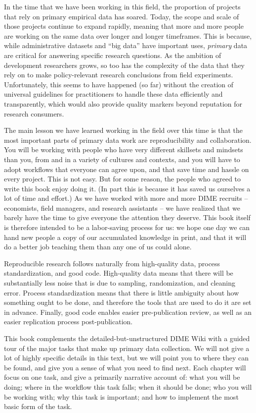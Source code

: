 In the time that we have been working in this field,
the proportion of projects that rely on primary empirical data has soared.\cite{angrist2017economic}
Today, the scope and scale of those projects continue to expand rapidly,
meaning that more and more people are working on the same data over longer and longer timeframes.
This is because, while administrative datasets and ``big data'' have important uses,
\textit{primary} data are critical for answering specific research questions.
As the ambition of development researchers grows, so too has the complexity of the data
that they rely on to make policy-relevant research conclusions from field experiments.
Unfortunately, this seems to have happened (so far) without the creation of
universal guidelines for practitioners to handle these data efficiently and transparently,
which would also provide quality markers beyond reputation for research consumers.

The main lesson we have learned working in the field over this time is that
the most important parts of primary data work are reproducibility and collaboration.
You will be working with people who have very different skillsets and mindsets than you,
from and in a variety of cultures and contexts, and you will have to adopt workflows
that everyone can agree upon, and that save time and hassle on every project.
This is not easy. But for some reason, the people who agreed to write this book enjoy doing it.
(In part this is because it has saved us ourselves a lot of time and effort.)
As we have worked with more and more DIME recruits -- economists, field managers, and research assistants --
we have realized that we barely have the time to give everyone the attention they deserve.
This book itself is therefore intended to be a labor-saving process for us:
we hope one day we can hand new people a copy of our accumulated knowledge in print,
and that it will do a better job teaching them than any one of us could alone.

Reproducible research follows naturally from high-quality data, process standardization, and good code.
High-quality data means that there will be substantially less noise
that is due to sampling, randomization, and cleaning error.
Process standardization means that there is little ambiguity about how something ought to be done,
and therefore the tools that are used to do it are set in advance.
Finally, good code enables easier pre-publication review,
as well as an easier replication process post-publication.

This book complements the detailed-but-unstructured DIME Wiki
with a guided tour of the major tasks that make up primary data collection.
We will not give a lot of highly specific details in this text,
but we will point you to where they can be found, and give you a sense of what you need to find next.
Each chapter will focus on one task, and give a primarily narrative account of: what you will be doing; where in the workflow this task falls; when it should be done; who you will be working with; why this task is important; and how to implement the most basic form of the task.


